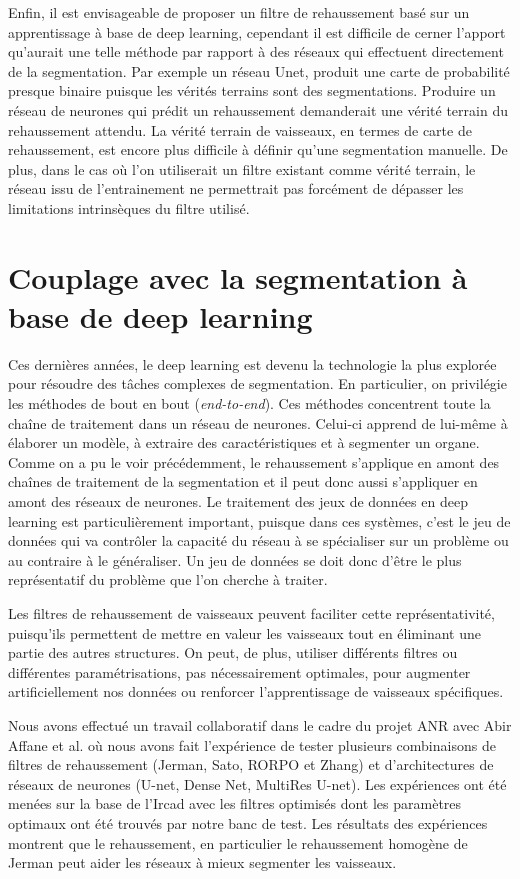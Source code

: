 Enfin, il est envisageable de proposer un filtre de rehaussement basé sur un apprentissage à base de deep learning, cependant il est difficile de cerner l'apport qu'aurait une telle méthode par rapport à des réseaux qui effectuent directement de la segmentation. Par exemple un réseau Unet, produit une carte de probabilité presque binaire puisque les vérités terrains sont des segmentations. Produire un réseau de neurones qui prédit un rehaussement demanderait une vérité terrain du rehaussement attendu. La vérité terrain de vaisseaux, en termes de carte de rehaussement, est encore plus difficile à définir qu'une segmentation manuelle. De plus, dans le cas où l'on utiliserait un filtre existant comme vérité terrain, le réseau issu de l'entrainement ne permettrait pas forcément de dépasser les limitations intrinsèques du filtre utilisé.

\section{Couplage avec la segmentation à base de deep learning}

Ces dernières années, le deep learning est devenu la technologie la plus explorée pour résoudre des tâches complexes de segmentation. En particulier,  on privilégie les méthodes de bout en bout (\textit{end-to-end}). Ces méthodes concentrent toute la chaîne de traitement dans un réseau de neurones. Celui-ci apprend de lui-même à élaborer un modèle, à extraire des caractéristiques et à segmenter un organe. Comme on a pu le voir précédemment, le rehaussement s'applique en amont des chaînes de traitement de la segmentation et il peut donc aussi s'appliquer en amont des réseaux de neurones. Le traitement des jeux de données en deep learning est particulièrement important, puisque dans ces systèmes, c'est le jeu de données qui va contrôler la capacité du réseau à se spécialiser sur un problème ou au contraire à le généraliser. Un jeu de données se doit donc d'être le plus représentatif du problème que l'on cherche à traiter.

Les filtres de rehaussement de vaisseaux peuvent faciliter cette représentativité, puisqu'ils permettent de mettre en valeur les vaisseaux tout en éliminant une partie des autres structures. On peut, de plus, utiliser différents filtres ou différentes paramétrisations, pas nécessairement optimales, pour augmenter artificiellement nos données ou renforcer l'apprentissage de vaisseaux spécifiques.

Nous avons effectué un travail collaboratif \cite{Affane_2022_article_commun} dans le cadre du projet ANR avec Abir Affane et al. où nous avons fait l'expérience de tester plusieurs combinaisons de filtres de rehaussement (Jerman, Sato, RORPO et Zhang) et d'architectures de réseaux de neurones (U-net, Dense Net, MultiRes U-net). Les expériences ont été menées sur la base de l'Ircad avec les filtres optimisés dont les paramètres optimaux ont été trouvés par notre banc de test. Les résultats des expériences montrent que le rehaussement, en particulier le rehaussement homogène de Jerman peut aider les réseaux à mieux segmenter les vaisseaux.

